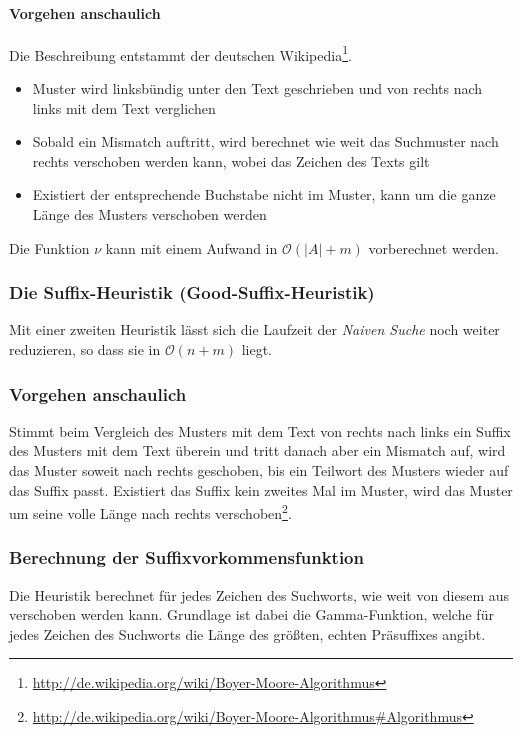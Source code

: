 \paragraph{Vorgehen anschaulich}
Die Beschreibung entstammt der deutschen Wikipedia\footnote{\url{http://de.wikipedia.org/wiki/Boyer-Moore-Algorithmus}}.
\begin{itemize}
	\item Muster wird linksbündig unter den Text geschrieben und von rechts nach links mit dem Text verglichen
	\item Sobald ein Mismatch auftritt, wird berechnet wie weit das Suchmuster nach rechts verschoben werden kann, wobei das Zeichen des Texts gilt
	\item Existiert der entsprechende Buchstabe nicht im Muster, kann um die ganze Länge des Musters verschoben werden
\end{itemize}
Die Funktion \(\nu\) kann mit einem Aufwand in \(\mathcal{O}(|A|+m)\) vorberechnet werden.


\subsubsection{Die Suffix-Heuristik (Good-Suffix-Heuristik)}
Mit einer zweiten Heuristik lässt sich die Laufzeit der \textit{Naiven Suche} noch weiter reduzieren, so dass sie in \(\mathcal{O}(n+m)\) liegt.

\subsubsection{Vorgehen anschaulich}
Stimmt beim Vergleich des Musters mit dem Text von rechts nach links ein Suffix des Musters mit dem Text überein und tritt danach aber ein Mismatch auf, wird das Muster soweit nach rechts geschoben, bis ein Teilwort des Musters wieder auf das Suffix passt. Existiert das Suffix kein zweites Mal im Muster, wird das Muster um seine volle Länge nach rechts verschoben\footnote{\url{http://de.wikipedia.org/wiki/Boyer-Moore-Algorithmus\#Algorithmus}}.

\subsubsection{Berechnung der Suffixvorkommensfunktion}
Die Heuristik berechnet für jedes Zeichen des Suchworts, wie weit von diesem aus verschoben werden kann. Grundlage ist dabei die Gamma-Funktion, welche für jedes Zeichen des Suchworts die Länge des größten, echten Präsuffixes angibt.

